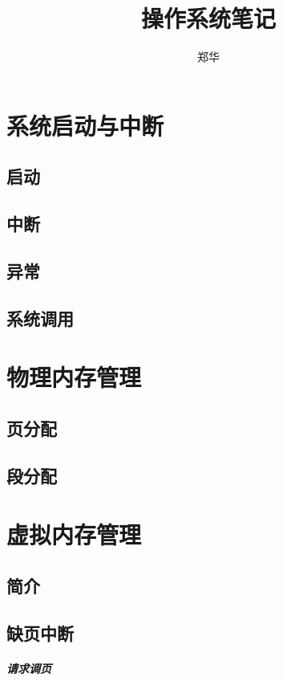 \documentclass[UTF8,a4paper,12pt]{ctexbook}
\author{\kaishu 郑华}
\title{\heiti 操作系统笔记}
\begin{document}
 	\maketitle
	\tableofcontents
	
\chapter{系统启动与中断}
	\section{启动}

	\section{中断}

	\section{异常}

	\section{系统调用}

\chapter{物理内存管理}
	\section{页分配}
		
	\section{段分配}

\chapter{虚拟内存管理}
	\section{简介}
		
	\section{缺页中断}
		\paragraph{请求调页}
		
\end{document}
